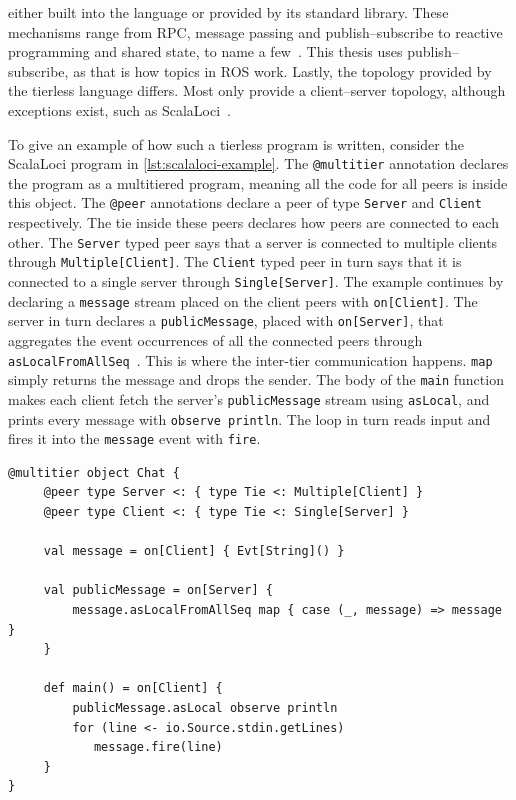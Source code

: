 \documentclass[a4paper]{book}
\begin{document}
either built into the language or provided by its standard library. These
mechanisms range from RPC, message passing and publish--subscribe to reactive
programming and shared state, to name a few~\cite{weisenburger2020survey}. This
thesis uses publish--subscribe, as that is how topics in ROS work. Lastly, the
topology provided by the tierless language differs. Most only provide a
client--server topology, although exceptions exist, such as
ScalaLoci~\cite{weisenburger2020survey, weisenburger2018scalaloci}.
\par
To give an example of how such a tierless program is written, consider the
ScalaLoci program in \cref{lst:scalaloci-example}. The
\texttt{@multitier} annotation declares the program as a multitiered program,
meaning all the code for all peers is inside this object. The \texttt{@peer}
annotations declare a peer of type \texttt{Server} and \texttt{Client}
respectively. The tie inside these peers declares how peers are connected to
each other. The \texttt{Server} typed peer says that a server is connected to
multiple clients through \texttt{Multiple[Client]}. The \texttt{Client} typed
peer in turn says that it is connected to a single server through
\texttt{Single[Server]}. The example continues by declaring a \texttt{message}
stream placed on the client peers with \texttt{on[Client]}. The server in turn
declares a \texttt{publicMessage}, placed with \texttt{on[Server]}, that
aggregates the event occurrences of all the connected peers through
\texttt{asLocalFromAllSeq}~\cite{weisenburger2018scalaloci}. This is where the
inter-tier communication happens. \texttt{map} simply returns the message and
drops the sender. The body of the \texttt{main} function makes each client fetch
the server's \texttt{publicMessage} stream using \texttt{asLocal}, and prints
every message with \texttt{observe println}. The loop in turn reads input and
fires it into the \texttt{message} event with \texttt{fire}.
\begin{listing}[ht]
	\begin{lstlisting}[language=ScalaLoci]
@multitier object Chat {
     @peer type Server <: { type Tie <: Multiple[Client] }
     @peer type Client <: { type Tie <: Single[Server] }

     val message = on[Client] { Evt[String]() }

     val publicMessage = on[Server] {
         message.asLocalFromAllSeq map { case (_, message) => message }
     }

     def main() = on[Client] {
         publicMessage.asLocal observe println
         for (line <- io.Source.stdin.getLines)
            message.fire(line)
     }
}\end{lstlisting}
	\caption{Chat example from the ScalaLoci website~\cite{scalaloci_website}}
	\label{lst:scalaloci-example}
\end{listing}
\end{document}
